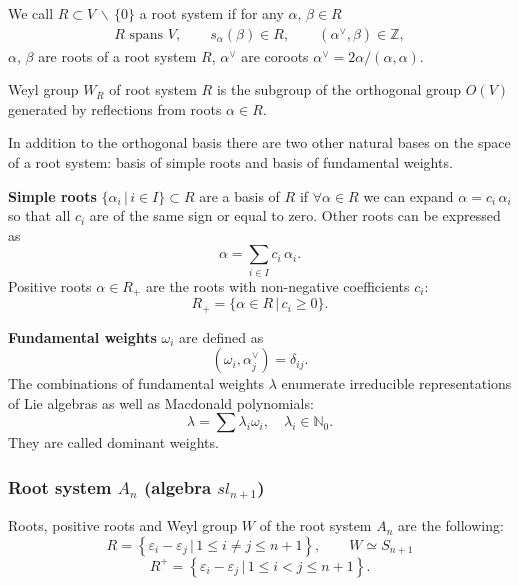 \documentclass{article}
\def\ve{\varepsilon}
\begin{document}
We call $R \subset V \, \backslash \, \{0\} $ a root system if for any $\alpha,\, \beta \in R$
\begin{align}
   R \text{ spans } V, \quad\quad
    s_{\alpha} (\beta) \in R, \quad\quad
    (\alpha^{\vee}, \beta) \in \mathbb{Z},
\end{align}
$\alpha$, $\beta$ are roots of a root system $R$, $\alpha^{\vee}$ are coroots $\alpha^{\vee} = 2\alpha/(\alpha,\alpha)$.

Weyl group $W_R$ of root system $R$ is the subgroup of the orthogonal group $O(V)$ generated by reflections from roots $\alpha \in R$.

In addition to the orthogonal basis there are two other natural bases on the space of a root system: basis of simple roots and basis of fundamental weights.

\textbf{Simple roots} $\{ \alpha_i \, |\, i\in I\} \subset R$ are a basis of $R$ if $\forall \alpha \in R$ we can expand $\alpha = c_i\,\alpha_i$ so that all $c_i$ are of the same sign or equal to zero. Other roots can be expressed as
\begin{equation}
    \alpha = \sum_{i\in I} c_i\,\alpha_i.
\end{equation}
\noindent
Positive roots  $\alpha \in R_+ $ are the roots with non-negative coefficients $c_i$:
\begin{equation}
    R_{+} = \{ \alpha \in R \,|\, c_i \geq 0 \}.
\end{equation}

\textbf{Fundamental weights} $\omega_i$ are defined as
\begin{equation}
    (\omega_i,\alpha_j^{\vee}) = \delta_{ij}.
\end{equation}
The combinations of fundamental weights $\lambda$ enumerate irreducible representations of Lie algebras as well as Macdonald polynomials:
\begin{equation}
    \lambda = \sum \lambda_i \omega_i, \quad \lambda_i \in \mathbb{N}_0.
\end{equation}
They are called dominant weights.

\subsubsection{Root system $A_n$ (algebra $sl_{n+1}$)}

Roots, positive roots and Weyl group $W$ of the root system $A_n$ are the following:
\begin{equation}
    R = \left\{\ve_i-\ve_j\,|\, 1\leq i \neq j \leq n+1\right\}, \quad\quad W \simeq S_{n+1} \end{equation}
 \begin{equation}
    R^{+} = \left\{\ve_i-\ve_j\,|\, 1\leq i < j \leq n+1\right\}. \label{rootsAplus}
    \end{equation}
\end{document}
